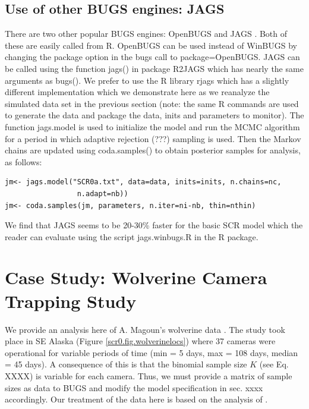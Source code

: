 \subsection{Use of other BUGS engines: JAGS}
There are two other popular BUGS engines: OpenBUGS \citep{thomas_etal:2006} and JAGS \citep{plummer:2003}. Both of these are easily called from R. OpenBUGS can be used instead of WinBUGS by changing the package option in the bugs call to package=OpenBUGS.  JAGS can be called using the function jags() in package R2JAGS which has nearly the same arguments as bugs().  We prefer to use the R library rjags \citep{plummer:2009} which has a slightly different implementation which we demonstrate here as we reanalyze the simulated data set in the previous section (note: the same R commands are used to generate the data and package the data, inits and parameters to monitor). The function jags.model is used to initialize the model and run the MCMC algorithm for a period in which adaptive rejection (???) sampling is used. Then the Markov chains are updated using coda.samples() to obtain posterior samples for analysis, as follows:

\begin{verbatim}
jm<- jags.model("SCR0a.txt", data=data, inits=inits, n.chains=nc,
                 n.adapt=nb))
jm<- coda.samples(jm, parameters, n.iter=ni-nb, thin=nthin)
\end{verbatim}

We find that JAGS seems to be 20-30\% faster for the basic SCR model which the reader can evaluate using the script jags.winbugs.R in the R package. 


\section{Case Study: Wolverine Camera Trapping Study}
\label{scr0.sec.wolverine}

We provide an analysis here of A. Magoun's wolverine data
\citep{magoun_etal:2011, royle_etal:2011}. The study took place in SE
Alaska (Figure \ref{scr0.fig.wolverinelocs}) where 37 cameras were
operational for variable periods of time (min = 5 days, max = 108
days, median = 45 days).  A consequence of this is that the binomial
sample size $K$ (see Eq. XXXX) is variable for each camera. Thus, we
must provide a matrix of sample sizes as data to BUGS and modify the
model specification in sec. xxxx accordingly. Our treatment of the
data here is based on the analysis of  \citet{royle_etal:2011}.


